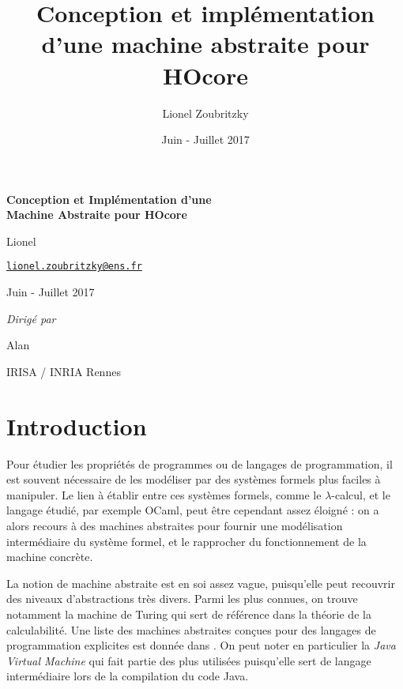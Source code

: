 \documentclass[11pt]{article}
\author{Lionel Zoubritzky}
\date{Juin - Juillet 2017}
\title{Conception et implémentation d'une machine abstraite pour HOcore}
\begin{document}
\begin{center}
	
	
	\vspace{0.5cm}
	
	
	\vspace{5cm}
	
	{\LARGE \bf Conception et Implémentation d'une \\ Machine Abstraite pour HOcore}
	
	\vspace{2cm}
	
	Lionel 
	
	\texttt{\href{mailto:lionel.zoubritzky@ens.fr}{lionel.zoubritzky@ens.fr}}
	
	
	\vspace{1cm}
	
	Juin - Juillet 2017
	
	
	\vspace{1.5cm}
	
	\textsl{Dirigé par}
	
	Alan 
	
	\vspace{1cm}
	
	IRISA / INRIA Rennes
	\thispagestyle{empty}
\end{center}

\clearpage
\setcounter{page}{1}
\tableofcontents
\clearpage


\section{Introduction}
\label{sec-1}

Pour étudier les propriétés de programmes ou de langages de programmation, il est souvent nécessaire de les modéliser par des systèmes formels plus faciles à manipuler. 
Le lien à établir entre ces systèmes formels, comme le $\lambda$-calcul, et le langage étudié, par exemple OCaml, peut être cependant assez éloigné : on a alors recours à des machines abstraites pour fournir une modélisation intermédiaire du système formel, et le rapprocher du fonctionnement de la machine concrète.

La notion de machine abstraite est en soi assez vague, puisqu'elle peut recouvrir des niveaux d'abstractions très divers.
Parmi les plus connues, on trouve notamment la machine de Turing qui sert de référence dans la théorie de la calculabilité.
Une liste des machines abstraites conçues pour des langages de programmation explicites est donnée dans \cite{Diehl00}. On peut noter en particulier la \emph{Java Virtual Machine} qui fait partie des plus utilisées puisqu'elle sert de langage intermédiaire lors de la compilation du code Java.
\end{document}
